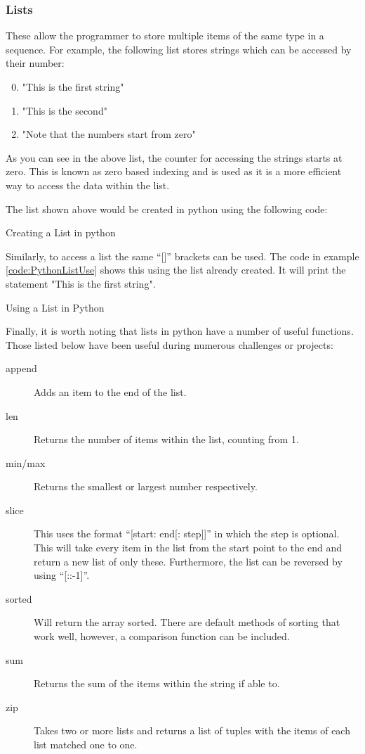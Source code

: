 			\subsubsection{Lists}
				These allow the programmer to store multiple items of the same type in a sequence. 
				For example, the following list stores strings which can be accessed by their number:
				\begin{enumerate}\setcounter{enumi}{-1} %
					\item "This is the first string"
					\item "This is the second"
					\item "Note that the numbers start from zero"
				\end{enumerate}
				As you can see in the above list, the counter for accessing the strings starts at zero. 
				This is known as zero based indexing and is used as it is a more efficient way to access the data within the list.

				The list shown above would be created in python using the following code:
				\begin{code}
					\centering
					
					\caption{Creating a List in python}
					\label{code:PythonListCreation}
				\end{code}

				Similarly, to access a list the same ``[]'' brackets can be used. 
				The code in example \ref{code:PythonListUse} shows this using the list already created. 
				It will print the statement "This is the first string". 
				\begin{code}
					\centering
					
					\caption{Using a List in Python}
					\label{code:PythonListUse}
				\end{code}

				Finally, it is worth noting that lists in python have a number of useful functions. 
				Those listed below have been useful during numerous challenges or projects:
				\begin{description}
					\item[append] Adds an item to the end of the list. 
					\item[len] Returns the number of items within the list, counting from 1. 
					\item[min/max] Returns the smallest or largest number respectively. 
					\item[slice] This uses the format ``[start: end[: step]]'' in which the step is optional. 
						This will take every item in the list from the start point to the end and return a new list of only these. 
						Furthermore, the list can be reversed by using ``[::-1]''. 
					\item[sorted] Will return the array sorted. 
						There are default methods of sorting that work well, however, a comparison function can be included. 
					\item[sum] Returns the sum of the items within the string if able to. 
					\item[zip] Takes two or more lists and returns a list of tuples with the items of each list matched one to one. 
				\end{description}
